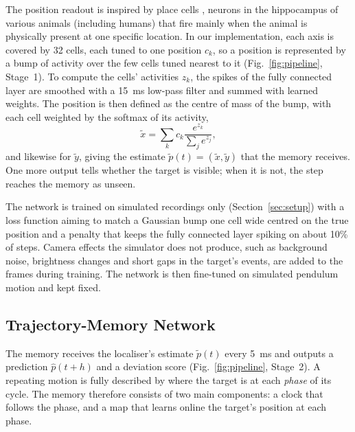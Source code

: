 \documentclass[conference]{IEEEtran}
\begin{document}
The position readout is inspired by place cells \cite{OKeefe1971The}, neurons in the hippocampus of various animals (including humans) that fire mainly when the animal is physically present at one specific location. In our implementation, each axis is covered by 32 cells, each tuned to one position $c_k$, so a position is represented by a bump of activity over the few cells tuned nearest to it (Fig.~\ref{fig:pipeline}, Stage~1). To compute the cells' activities $z_k$, the spikes of the fully connected layer are smoothed with a 15~ms low-pass filter and summed with learned weights. The position is then defined as the centre of mass of the bump, with each cell weighted by the softmax of its activity,
\begin{equation}
\tilde{x} = \sum_k c_k \frac{e^{z_k}}{\sum_j e^{z_j}},
\end{equation}
and likewise for $\tilde{y}$, giving the estimate $\tilde{p}(t) = (\tilde{x}, \tilde{y})$ that the memory receives.
One more output tells whether the target is visible; when it is not, the step reaches the memory as unseen.

The network is trained on simulated recordings only (Section~\ref{sec:setup}) with a loss function aiming to match a Gaussian bump one cell wide centred on the true position and a penalty that keeps the fully connected layer spiking on about 10\% of steps. Camera effects the simulator does not produce, such as background noise, brightness changes and short gaps in the target's events, are added to the frames during training. The network is then fine-tuned on simulated pendulum motion and kept fixed.

\subsection{Trajectory-Memory Network}
\label{sec:memory}
The memory receives the localiser's estimate $\tilde{p}(t)$ every 5~ms and outputs a prediction $\hat{p}(t+h)$ and a deviation score (Fig.~\ref{fig:pipeline}, Stage~2). A repeating motion is fully described by where the target is at each \emph{phase} of its cycle. The memory therefore consists of two main components: a clock that follows the phase, and a map that learns online the target's position at each phase.
\end{document}

